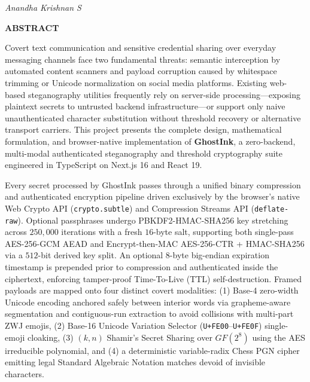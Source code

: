 \documentclass[12pt,a4paper,oneside,openany]{report}
\begin{document}
\noindent
\begin{flushright}
    \textit{Anandha Krishnan S}
\end{flushright}

\vfill

\clearpage
\thispagestyle{plain}
\begin{center}
    {\Large \textbf{ABSTRACT}}\\[0.8cm]
\end{center}

\hspace*{0.5in}Covert text communication and sensitive credential sharing over everyday messaging channels face two fundamental threats: semantic interception by automated content scanners and payload corruption caused by whitespace trimming or Unicode normalization on social media platforms. Existing web-based steganography utilities frequently rely on server-side processing---exposing plaintext secrets to untrusted backend infrastructure---or support only naive unauthenticated character substitution without threshold recovery or alternative transport carriers. This project presents the complete design, mathematical formulation, and browser-native implementation of \textbf{GhostInk}, a zero-backend, multi-modal authenticated steganography and threshold cryptography suite engineered in TypeScript on Next.js 16 and React 19.

\hspace*{0.5in}Every secret processed by GhostInk passes through a unified binary compression and authenticated encryption pipeline driven exclusively by the browser's native Web Crypto API (\texttt{crypto.subtle}) and Compression Streams API (\texttt{deflate-raw}). Optional passphrases undergo PBKDF2-HMAC-SHA256 key stretching across $250{,}000$ iterations with a fresh $16$-byte salt, supporting both single-pass AES-256-GCM AEAD and Encrypt-then-MAC AES-256-CTR + HMAC-SHA256 via a $512$-bit derived key split. An optional $8$-byte big-endian expiration timestamp is prepended prior to compression and authenticated inside the ciphertext, enforcing tamper-proof Time-To-Live (TTL) self-destruction. Framed payloads are mapped onto four distinct covert modalities: (1) Base-4 zero-width Unicode encoding anchored safely between interior words via grapheme-aware segmentation and contiguous-run extraction to avoid collisions with multi-part ZWJ emojis, (2) Base-16 Unicode Variation Selector (\texttt{U+FE00}--\texttt{U+FE0F}) single-emoji cloaking, (3) $(k, n)$ Shamir's Secret Sharing over $GF(2^8)$ using the AES irreducible polynomial, and (4) a deterministic variable-radix Chess PGN cipher emitting legal Standard Algebraic Notation matches devoid of invisible characters.
\end{document}
